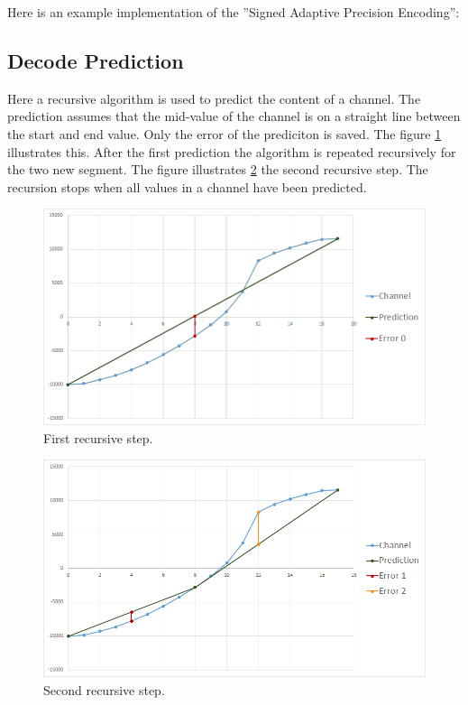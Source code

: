 Here is an example implementation of the ''Signed Adaptive Precision Encoding'':\\


\pagebreak
\subsection{Decode Prediction}\label{anhang:format:prediction}
Here a recursive algorithm is used to predict the content of a channel. The prediction assumes that the mid-value of the channel is on a straight line between the start and end value. Only the error of the prediciton is saved. The figure \ref{anhang:prediction:step1} illustrates this. After the first prediction the algorithm is repeated recursively for the two new segment. The figure illustrates \ref{anhang:prediction:step2} the second recursive step. The recursion stops when all values in a channel have been predicted.

\begin{figure}[!htbp]
	\center
	\includegraphics[width=1\textwidth,keepaspectratio]{./pictures/anhang/prediction0.png}
	\caption{First recursive step.}
	\label{anhang:prediction:step1}
\end{figure}
\begin{figure}[!htbp]
	\center
	\includegraphics[width=1\textwidth,keepaspectratio]{./pictures/anhang/prediction1.png}
	\caption{Second recursive step.}
	\label{anhang:prediction:step2}
\end{figure}

